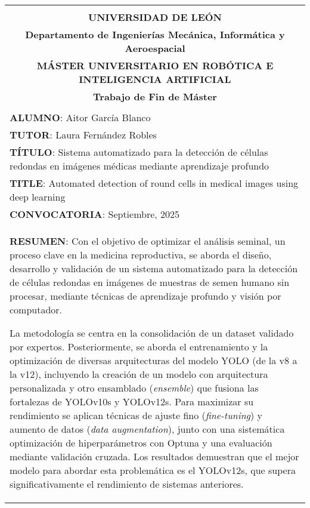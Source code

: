 \begin{center}
\end{center}

\setlength{\LTleft}{-1.25cm}      %
\setlength{\LTright}{0pt}      %

\begin{longtable}{|l|l|}
	\cline{1-2}
	\multicolumn{2}{|c|}{}	\\
	\multicolumn{2}{|c|}{\textbf{UNIVERSIDAD DE LEÓN}}	\\
	\multicolumn{2}{|c|}{\textbf{Departamento de Ingenierías Mecánica, Informática y Aeroespacial}}	\\ 
	\multicolumn{2}{|c|}{\textbf{MÁSTER UNIVERSITARIO EN ROBÓTICA E INTELIGENCIA ARTIFICIAL}}	\\
	\multicolumn{2}{|c|}{\textbf{Trabajo de Fin de Máster}}	\\ 
	\multicolumn{2}{|c|}{}	\\ \hline
	\multicolumn{2}{|l|}{\textbf{ALUMNO}: Aitor García Blanco}	\\ \hline
	\multicolumn{2}{|l|}{\textbf{TUTOR}: Laura Fernández Robles}	\\ \hline
	\multicolumn{2}{|p{17cm}|}{\textbf{TÍTULO}: Sistema automatizado para la detección de células redondas en imágenes médicas mediante aprendizaje profundo} \\ \hline
	\multicolumn{2}{|p{17cm}|}{\textbf{TITLE}: Automated detection of round cells in medical images using deep learning} \\ \hline
	\multicolumn{2}{|l|}{\textbf{CONVOCATORIA}: Septiembre, 2025}		\\ \hline
	\multicolumn{2}{|p{17cm}|}{\textbf{RESUMEN}: Con el objetivo de optimizar el análisis seminal, un proceso clave en la medicina reproductiva, 
	se aborda el diseño, desarrollo y validación de un sistema automatizado para la detección de células redondas en imágenes de muestras de semen 
	humano sin procesar, mediante técnicas de aprendizaje profundo y visión por computador.
	
	La metodología se centra en la consolidación de un dataset validado por expertos. Posteriormente, se aborda el entrenamiento y la optimización de 
	diversas arquitecturas del modelo YOLO (de la v8 a la v12), incluyendo la creación de un modelo con arquitectura personalizada y otro ensamblado (\textit{ensemble})
	que fusiona las fortalezas de YOLOv10s y YOLOv12s. Para maximizar su rendimiento se aplican técnicas de ajuste fino (\textit{fine-tuning}) y aumento de datos 
	(\textit{data augmentation}), junto con una sistemática optimización de hiperparámetros con Optuna y una evaluación mediante validación cruzada. 
	Los resultados demuestran que el mejor modelo para abordar esta problemática es el YOLOv12s, que supera significativamente el rendimiento de 
	sistemas anteriores.
	
}
\end{longtable}
